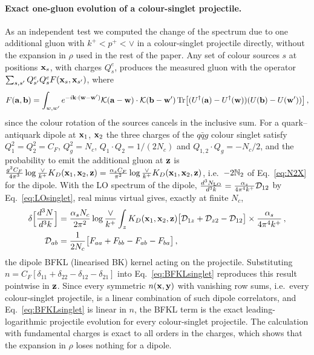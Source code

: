\paragraph{Exact one-gluon evolution of a colour-singlet projectile.} As an independent test we computed the change of the spectrum due to one additional gluon with $k^+<p^+<\vee$ in a colour-singlet projectile directly, without the expansion in $\rho$ used in the rest of the paper. Any set of colour sources $s$ at positions $\mathbf{x}_s$, with charges $Q_s^e$, produces the measured gluon with the operator $\sum_{s,s'}Q^e_{s'}Q^e_sF(\mathbf{x}_s,\mathbf{x}_{s'})$, where
\begin{align}
F(\mathbf{a},\mathbf{b})=\int_{w,w'}e^{-i\mathbf{k}\cdot(\mathbf{w}-\mathbf{w}')}\mathcal{K}(\mathbf{a}-\mathbf{w})\cdot\mathcal{K}(\mathbf{b}-\mathbf{w}')\,{\rm Tr}\big[(U^\dagger(\mathbf{a})-U^\dagger(\mathbf{w}))(U(\mathbf{b})-U(\mathbf{w}'))\big]\,,
\end{align}
since the colour rotation of the sources cancels in the inclusive sum. For a quark--antiquark dipole at $\mathbf{x}_1$, $\mathbf{x}_2$ the three charges of the $q\bar qg$ colour singlet satisfy $Q_1^2=Q_2^2=C_F$, $Q_g^2=N_c$, $Q_1\cdot Q_2=1/(2N_c)$ and $Q_{1,2}\cdot Q_g=-N_c/2$, and the probability to emit the additional gluon at $\mathbf{z}$ is $\frac{g^2C_F}{4\pi^3}\log\frac{\vee}{k^+}K_D(\mathbf{x}_1,\mathbf{x}_2,\mathbf{z})=\frac{\alpha_sC_F}{\pi^2}\log\frac{\vee}{k^+}K_D(\mathbf{x}_1,\mathbf{x}_2,\mathbf{z})$, i.e.\ $-2\mathbb{N}_2$ of Eq.~\eqref{eq:N2X} for the dipole. With the LO spectrum of the dipole, $\frac{d^3N_{\rm LO}}{d^3k}=\frac{\alpha_s}{4\pi^4k^+}\mathcal D_{12}$ by Eq.~\eqref{eq:LOsinglet}, real minus virtual gives, exactly at finite $N_c$,
\begin{align}
\delta\Big[\frac{d^3N}{d^3k}\Big]&=\frac{\alpha_sN_c}{2\pi^2}\log\frac{\vee}{k^+}\int_zK_D(\mathbf{x}_1,\mathbf{x}_2,\mathbf{z})\big[\mathcal D_{1z}+\mathcal D_{z2}-\mathcal D_{12}\big]\times\frac{\alpha_s}{4\pi^4k^+}\,,\notag\\
\mathcal D_{ab}&=\frac{1}{2N_c}\big[F_{aa}+F_{bb}-F_{ab}-F_{ba}\big]\,,
\end{align}
the dipole BFKL (linearised BK) kernel acting on the projectile. Substituting $n=C_F[\delta_{11}+\delta_{22}-\delta_{12}-\delta_{21}]$ into Eq.~\eqref{eq:BFKLsinglet} reproduces this result pointwise in $\mathbf{z}$. Since every symmetric $n(\mathbf{x},\mathbf{y})$ with vanishing row sums, i.e.\ every colour-singlet projectile, is a linear combination of such dipole correlators, and Eq.~\eqref{eq:BFKLsinglet} is linear in $n$, the BFKL term is the exact leading-logarithmic projectile evolution for every colour-singlet projectile. The calculation with fundamental charges is exact to all orders in the charges, which shows that the expansion in $\rho$ loses nothing for a dipole.

